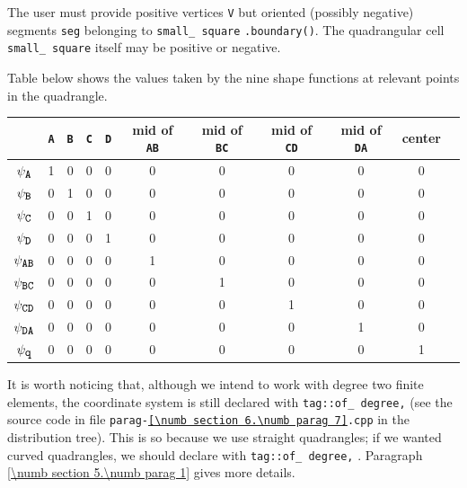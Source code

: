 The user must provide positive vertices {\small\tt V} but oriented (possibly negative) segments
{\small\tt seg} belonging to {\small\tt small\_\,square} {\small\tt .boundary()}.
The quadrangular cell {\small\tt small\_\,square} itself may be positive or negative.

Table below shows the values taken by the nine shape functions at relevant points in the quadrangle.

\begin{center}\begin{tabular}{ | c || c | c | c | c | c | c | c | c | c | c | }
  \hline
  & {\small\tt A} & {\small\tt B} & {\small\tt C} & {\small\tt D} & mid of {\small\tt AB} &
  mid of {\small\tt BC} & mid of {\small\tt CD} & mid of {\small\tt DA} & center
  \\ \hline\hline
  $ \psi_{\mbox{\small\tt A}} $ & 1 & 0 & 0 & 0 & 0 & 0 & 0 & 0 & 0
  \\ \hline
  $ \psi_{\mbox{\small\tt B}} $ & 0 & 1 & 0 & 0 & 0 & 0 & 0 & 0 & 0
  \\ \hline
  $ \psi_{\mbox{\small\tt C}} $ & 0 & 0 & 1 & 0 & 0 & 0 & 0 & 0 & 0
  \\ \hline
  $ \psi_{\mbox{\small\tt D}} $ & 0 & 0 & 0 & 1 & 0 & 0 & 0 & 0 & 0
  \\ \hline
  $ \psi_{\mbox{\small\tt AB}} $ & 0 & 0 & 0 & 0 & 1 & 0 & 0 & 0 & 0
  \\ \hline
  $ \psi_{\mbox{\small\tt BC}} $ & 0 & 0 & 0 & 0 & 0 & 1 & 0 & 0 & 0
  \\ \hline
  $ \psi_{\mbox{\small\tt CD}} $ & 0 & 0 & 0 & 0 & 0 & 0 & 1 & 0 & 0
  \\ \hline
  $ \psi_{\mbox{\small\tt DA}} $ & 0 & 0 & 0 & 0 & 0 & 0 & 0 & 1 & 0
  \\ \hline
  $ \psi_{\mbox{\small\tt q}} $ & 0 & 0 & 0 & 0 & 0 & 0 & 0 & 0 & 1
  \\ \hline
\end{tabular}\end{center}

It is worth noticing that, although we intend to work with degree two finite elements,
the coordinate system {\small\tt{}} is still declared with
{\small\tt\textcolor{tag}{tag}::of\_\,degree,} {\small\tt{}}
(see the source code in file {\small\tt parag-\ref{\numb section 6.\numb parag 7}.cpp}
in the distribution tree).
This is so because we use straight quadrangles; if we wanted curved quadrangles, we should
declare {\small\tt{}} with {\small\tt\textcolor{tag}{tag}::of\_\,degree,}
{\small\tt{}}.
Paragraph \ref{\numb section 5.\numb parag 1} gives more details.


